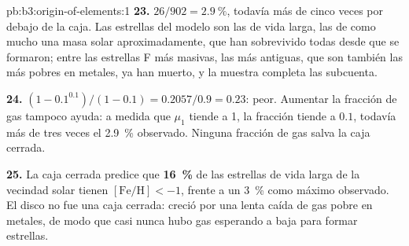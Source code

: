 \begin{solution}{pb:b3:origin-of-elements:1}
\textbf{23.} $26/902 = \qty{2.9}{\percent}$, todavía más de cinco veces por debajo
de la caja. Las estrellas del modelo son las de vida larga, las de como mucho
una masa solar aproximadamente, que han sobrevivido todas desde que se formaron;
entre las estrellas F más masivas, las más antiguas, que son también las más
pobres en metales, ya han muerto, y la muestra completa las subcuenta.

\textbf{24.} $(1 - 0.1^{0.1})/(1 - 0.1) = 0.2057/0.9 = \num{0.23}$: peor.
Aumentar la fracción de gas tampoco ayuda: a medida que $\mu_1$ tiende a 1,
la fracción tiende a $0.1$, todavía más de tres veces el
\qty{2.9}{\percent} observado. Ninguna fracción de gas salva la caja cerrada.

\textbf{25.} La caja cerrada predice que
\textbf{\qty[text-series-to-math=true]{16}{\percent}} de las estrellas de vida larga
de la vecindad solar tienen $[\mathrm{Fe/H}] < -1$, frente a un \qty{3}{\percent}
como máximo observado. El disco no fue una caja cerrada: creció por una lenta
caída de gas pobre en metales, de modo que casi nunca hubo gas esperando a baja
 para formar estrellas.
\end{solution}
